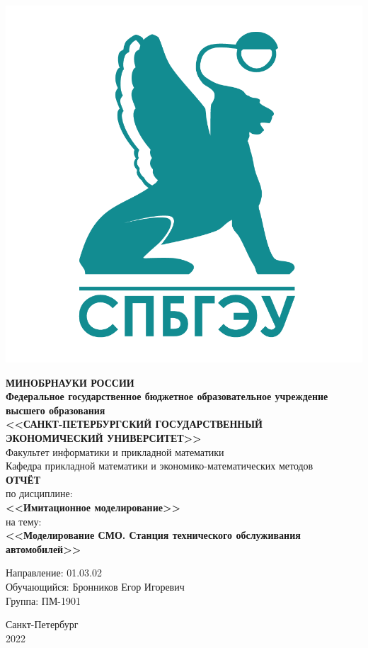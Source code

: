 \documentclass[14pt,fleqn]{extarticle}
\begin{document}
	\begin{titlepage}
		\includegraphics[scale=0.12]{logo}
		\begin{center}
			\textbf{МИНОБРНАУКИ РОССИИ}\\
			\vspace{0.2cm}
			\textbf{Федеральное государственное бюджетное образовательное учреждение высшего образования}\\
			\textbf{<<САНКТ-ПЕТЕРБУРГСКИЙ ГОСУДАРСТВЕННЫЙ ЭКОНОМИЧЕСКИЙ УНИВЕРСИТЕТ>>}\\
			\vspace{0.6cm}
			Факультет информатики и прикладной математики\\
			Кафедра прикладной математики и экономико-математических методов\\
			\vspace{1cm}
			\textbf{ОТЧЁТ}\\
			по дисциплине:\\
			\textbf{<<Имитационное моделирование>>}\\
			на тему:\\
			\textbf{<<Моделирование СМО. Станция технического обслуживания автомобилей>>}\\
		\end{center}
		\vspace{1cm}
		Направление: 01.03.02\\
		Обучающийся: Бронников Егор Игоревич\\
		Группа: ПМ-1901\\
		\vfill
		\begin{center}
			Санкт-Петербург\\
			2022\\
		\end{center}
	\end{titlepage}
\end{document}
